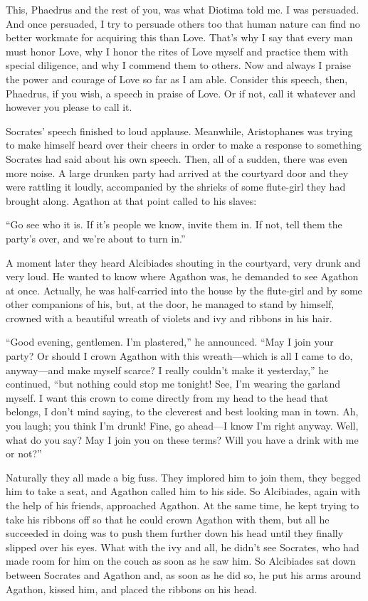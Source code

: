 This, Phaedrus and the rest of you, was what Diotima told me. I was
persuaded. And once persuaded, I try to persuade others too that human
nature can find no better workmate for acquiring this than Love. That’s
why I say that every man must honor Love, why I honor the rites of Love
myself and practice them with special diligence, and why I commend them
to others. Now and always I praise the power and courage of Love so far
 as I am able. Consider this speech, then, Phaedrus, if you wish,
a speech in praise of Love. Or if not, call it whatever and however you
please to call it.

\blank[line]

Socrates’ speech finished to loud applause. Meanwhile, Aristophanes was
trying to make himself heard over their cheers in order to make a
response to something Socrates had said about his own
speech. Then, all of
a sudden, there was even more noise. A large drunken party had arrived
at the courtyard door and they were rattling it loudly, accompanied by
the shrieks of some flute-girl they had brought along. Agathon at that
point called to his slaves:

 “Go see who it is. If it’s people we know, invite them in. If
not, tell them the party’s over, and we’re about to turn in.”

A moment later they heard Alcibiades shouting in the courtyard, very
drunk and very loud. He wanted to know where Agathon was, he demanded to
see Agathon at once. Actually, he was half-carried into the 
house by the flute-girl and by some other companions of his, but, at the
door, he managed to stand by himself, crowned with a beautiful wreath of
violets and ivy and ribbons in his hair.

“Good evening, gentlemen. I’m plastered,” he announced. “May I join your
party? Or should I crown Agathon with this wreath---which is all I came
to do, anyway---and make myself scarce? I really couldn’t make it
yesterday,” he continued, “but nothing could stop me tonight! See, I’m
wearing the garland myself. I want this crown to come directly from my
head to the head that belongs, I don’t mind saying, to the cleverest and
best looking man in town. Ah, you laugh; you think I’m drunk! Fine, go
 ahead---I know I’m right anyway. Well, what do you say?
May I join you on these terms? Will you have a drink with me or not?”

Naturally they all made a big fuss. They implored him to join them, they
begged him to take a seat, and Agathon called him to his side. So
Alcibiades, again with the help of his friends, approached Agathon. At
the same time, he kept trying to take his ribbons off so that he could
crown Agathon with them, but all he succeeded in doing was to push them
further down his head until they finally slipped over his eyes. What
with the ivy and all, he didn’t see Socrates, who had made room for him
on the couch as soon as he saw him. So Alcibiades sat down between
Socrates  and Agathon and, as soon as he did so, he put his arms
around Agathon, kissed him, and placed the ribbons on his head.

